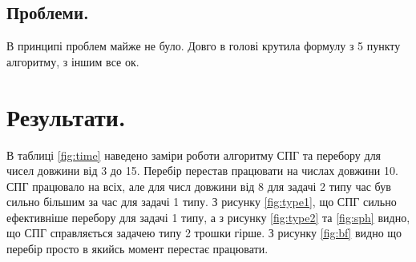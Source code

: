 \documentclass[a4paper,12pt]{article}
\begin{document}
\subsection{Проблеми.}
В принципі проблем майже не було. Довго в голові крутила формулу з 5 пункту алгоритму, з іншим все ок.
\section{Результати.}
В таблиці \ref{fig:time} наведено заміри роботи алгоритму СПГ та перебору для чисел довжини від 3 до 15. Перебір перестав працювати на числах довжини 10. СПГ працювало на всіх, але для числ довжини від 8 для задачі 2 типу час був сильно більшим за час для задачі 1 типу. З рисунку \ref{fig:type1}, що СПГ сильно ефективніше перебору для задачі 1 типу, а з рисунку \ref{fig:type2} та \ref{fig:sph} видно, що СПГ справляється задачею типу 2 трошки гірше. З рисунку \ref{fig:bf} видно що перебір просто в якийсь момент  перестає працювати. 
\end{document}
